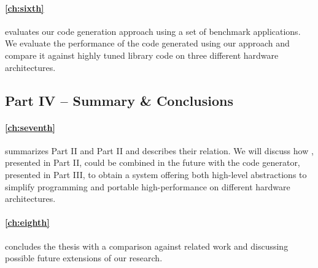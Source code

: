 \paragraph{\autoref{ch:sixth}} evaluates our code generation approach using a set of benchmark applications.
We evaluate the performance of the code generated using our approach and compare it against highly tuned library code on three different hardware architectures.

\subsection*{Part IV -- Summary \& Conclusions}

\paragraph{\autoref{ch:seventh}} summarizes Part II and Part II and describes their relation.
We will discuss how \SkelCL, presented in Part II, could be combined in the future with the code generator, presented in Part III, to obtain a system offering both high-level abstractions to simplify programming and portable high-performance on different hardware architectures.

\paragraph{\autoref{ch:eighth}} concludes the thesis with a comparison against related work and discussing possible future extensions of our research.

